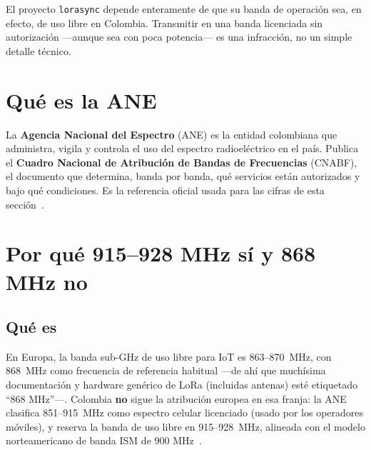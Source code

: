 El proyecto \texttt{lorasync} depende enteramente de que su banda de operación sea, en efecto,
de uso libre en Colombia. Transmitir en una banda licenciada sin autorización —aunque sea con
poca potencia— es una infracción, no un simple detalle técnico.

\chapter{Qué es la ANE}

La \textbf{Agencia Nacional del Espectro} (ANE) es la entidad colombiana que administra,
vigila y controla el uso del espectro radioeléctrico en el país. Publica el \textbf{Cuadro
Nacional de Atribución de Bandas de Frecuencias} (CNABF), el documento que determina, banda por
banda, qué servicios están autorizados y bajo qué condiciones. Es la referencia oficial usada
para las cifras de esta sección~\cite{ane_cnabf}.

\chapter{Por qué 915--928 MHz sí y 868 MHz no}

\section{Qué es}

En Europa, la banda sub-GHz de uso libre para IoT es \SI{863}{}--\SI{870}{MHz}, con
\SI{868}{MHz} como frecuencia de referencia habitual —de ahí que muchísima documentación y
hardware genérico de LoRa (incluidas antenas) esté etiquetado ``868 MHz''—. Colombia
\textbf{no} sigue la atribución europea en esa franja: la ANE clasifica
\SI{851}{}--\SI{915}{MHz} como espectro celular licenciado (usado por los operadores móviles),
y reserva la banda de uso libre en \SI{915}{}--\SI{928}{MHz}, alineada con el modelo
norteamericano de banda ISM de 900 MHz~\cite{ttn_au915}.

